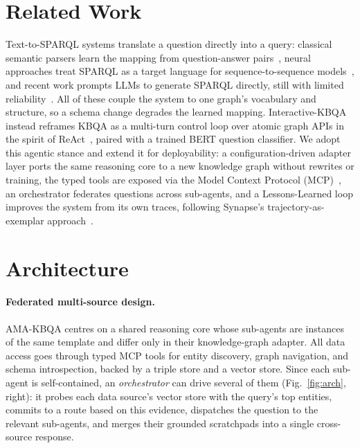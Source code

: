\documentclass[sigconf,natbib=true]{ceurart}
\begin{document}
\section{Related Work}
Text-to-SPARQL systems translate a question directly into a query:
classical semantic parsers learn the mapping from question-answer
pairs~\cite{berant2013semantic}, neural approaches treat SPARQL as a
target language for sequence-to-sequence
models~\cite{soru2017sparql,rony2022sgpt}, and recent work prompts
LLMs to generate SPARQL directly, still with limited
reliability~\cite{meyer2024assessing}. All of these couple the system
to one graph's vocabulary and structure, so a schema change degrades
the learned mapping.
Interactive-KBQA~\cite{xiong-etal-2024-interactive} instead reframes
KBQA as a multi-turn control loop over atomic graph APIs in the spirit
of ReAct~\cite{yao2023react}, paired with a trained BERT question
classifier. We adopt this
agentic stance and extend it for deployability: a configuration-driven
adapter layer ports the same reasoning core to a new knowledge graph
without rewrites or training, the typed tools are exposed via the
Model Context Protocol (MCP)~\cite{anthropic2024mcp}, an orchestrator
federates questions across sub-agents, and a Lessons-Learned loop
improves the system from its own traces, following Synapse's
trajectory-as-exemplar approach~\cite{zheng2024synapse}.

\section{Architecture}
\paragraph{Federated multi-source design.}
AMA-KBQA centres on a shared reasoning core whose sub-agents are
instances of the same template and differ only in their
knowledge-graph adapter. All data access goes through typed MCP tools
for entity discovery, graph navigation, and schema introspection,
backed by a triple store and a vector store.
Since each sub-agent is self-contained, an \emph{orchestrator} can
drive several of them (Fig.~\ref{fig:arch}, right): it probes each
data source's vector
store with the query's top entities, commits to a route based on this
evidence, dispatches the question to the relevant sub-agents, and
merges their grounded scratchpads into a single cross-source response.


\end{document}

